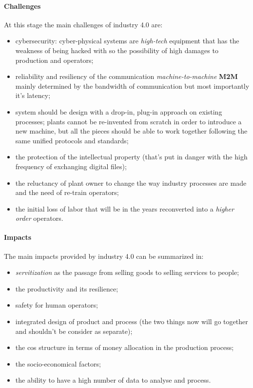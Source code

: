 	\paragraph{Challenges} At this stage the main challenges of industry 4.0 are:
	\begin{itemize}
		\item cybersecurity: cyber-physical systems are \textit{high-tech} equipment that has the weakness of being hacked with so the possibility of high damages to production and operators;
		\item reliability and resiliency of the communication \textit{machine-to-machine} \textbf{M2M} mainly determined by the bandwidth of communication but most importantly it's latency;
		\item system should be design with a drop-in, plug-in approach on existing processes; plants cannot be re-invented from scratch in order to introduce a new machine, but all the pieces should be able to work together following the same unified protocols and standards;
		\item the protection of the intellectual property (that's put in danger with the high frequency of exchanging digital files);
		\item the reluctancy of plant owner to change the way industry processes are made and the need of re-train operators;
		\item the initial loss of labor that will be in the years reconverted into a \textit{higher order} operators.
	\end{itemize}
	
	\paragraph{Impacts} The main impacts provided by industry 4.0 can be summarized in:
	\begin{itemize}
		\item \textit{servitization} as the passage from selling goods to selling services to people;
		\item the productivity and its resilience;
		\item safety for human operators;
		\item integrated design of product and process (the two things now will go together and shouldn't be consider as separate);
		\item the cos structure in terms of money allocation in the production process;
		\item the socio-economical factors;
		\item the ability to have a high number of data to analyse and process.
	\end{itemize}
	
